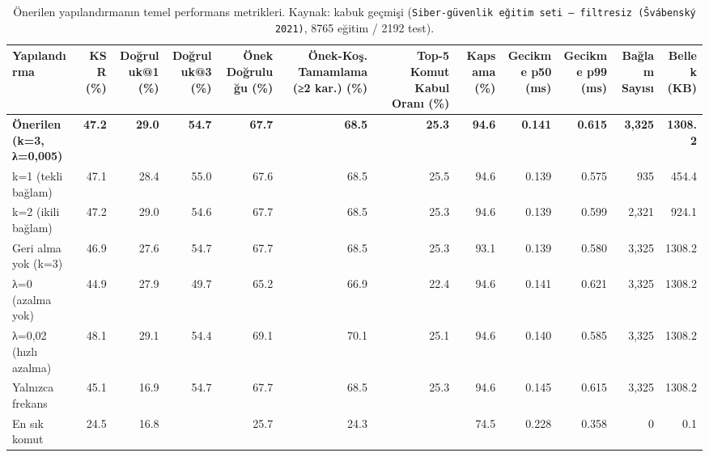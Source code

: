 \begin{table}[htbp]
  \centering
  \caption{Önerilen yapılandırmanın temel performans metrikleri. Kaynak: kabuk geçmişi (\texttt{Siber-güvenlik eğitim seti — filtresiz (Švábenský 2021)}, 8765 eğitim / 2192 test).}
  \label{tab:metrics_summary}
  \begin{tabular}{lrrrrrrrrrrr}
    \toprule
    Yapılandırma & KSR (\%) & Doğruluk@1 (\%) & Doğruluk@3 (\%) & Önek Doğruluğu (\%) & Önek-Koş. Tamamlama (≥2 kar.) (\%) & Top-5 Komut Kabul Oranı (\%) & Kapsama (\%) & Gecikme p50 (ms) & Gecikme p99 (ms) & Bağlam Sayısı & Bellek (KB) \\
    \midrule
    \textbf{Önerilen (k=3, λ=0,005)} & \textbf{47.2} & \textbf{29.0} & \textbf{54.7} & \textbf{67.7} & \textbf{68.5} & \textbf{25.3} & \textbf{94.6} & \textbf{0.141} & \textbf{0.615} & \textbf{3,325} & \textbf{1308.2} \\
    k=1 (tekli bağlam) & 47.1 & 28.4 & 55.0 & 67.6 & 68.5 & 25.5 & 94.6 & 0.139 & 0.575 & 935 & 454.4 \\
    k=2 (ikili bağlam) & 47.2 & 29.0 & 54.6 & 67.7 & 68.5 & 25.3 & 94.6 & 0.139 & 0.599 & 2,321 & 924.1 \\
    Geri alma yok (k=3) & 46.9 & 27.6 & 54.7 & 67.7 & 68.5 & 25.3 & 93.1 & 0.139 & 0.580 & 3,325 & 1308.2 \\
    λ=0 (azalma yok) & 44.9 & 27.9 & 49.7 & 65.2 & 66.9 & 22.4 & 94.6 & 0.141 & 0.621 & 3,325 & 1308.2 \\
    λ=0,02 (hızlı azalma) & 48.1 & 29.1 & 54.4 & 69.1 & 70.1 & 25.1 & 94.6 & 0.140 & 0.585 & 3,325 & 1308.2 \\
    Yalnızca frekans & 45.1 & 16.9 & 54.7 & 67.7 & 68.5 & 25.3 & 94.6 & 0.145 & 0.615 & 3,325 & 1308.2 \\
    En sık komut & 24.5 & 16.8 &  & 25.7 & 24.3 &  & 74.5 & 0.228 & 0.358 & 0 & 0.1 \\
    \bottomrule
  \end{tabular}
\end{table}
